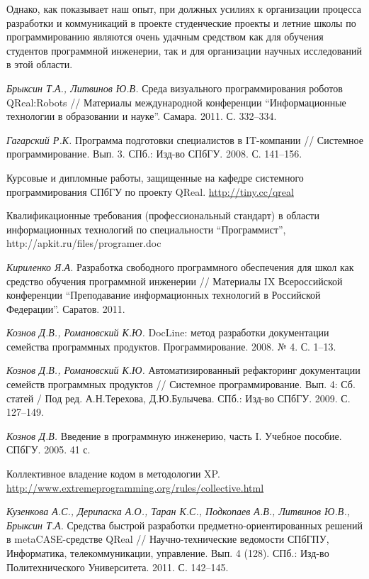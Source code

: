 \documentclass[a4paper]{article}
\begin{document}
Однако, как показывает наш опыт, при должных усилиях к организации процесса разработки и коммуникаций в проекте студенческие проекты и летние школы по программированию являются очень удачным средством как для обучения студентов программной инженерии, так и для организации научных исследований в этой области. 

\begin{thebibliography}{9001}

   \emph{Брыксин Т.А., Литвинов Ю.В.} Среда визуального программирования роботов QReal:Robots // Материалы международной конференции ``Информационные технологии в образовании и науке''. Самара. 2011. С. 332--334.
  
   \emph{Гагарский Р.К.} Программа подготовки специалистов в IT-компании // Системное программирование. Вып. 3. СПб.: Изд-во СПбГУ. 2008. С. 141--156.
  
   Курсовые и дипломные работы, защищенные на кафедре системного программирования СПбГУ по проекту QReal. \url{http://tiny.cc/qreal}

   Квалификационные требования (профессиональный стандарт) в области информационных технологий по специальности ``Программист'', http://apkit.ru/files/programer.doc
  
   \emph{Кириленко Я.А.} Разработка свободного программного обеспечения для школ как средство обучения программной инженерии // Материалы IX Всероссийской конференции ``Преподавание информационных технологий в Российской Федерации''. Саратов. 2011.
  
   \emph{Кознов Д.В., Романовский К.Ю.}  DocLine: метод разработки документации семейства программных продуктов. Программирование. 2008. № 4. С. 1--13.

   \emph{Кознов Д.В., Романовский К.Ю.} Автоматизированный рефакторинг документации семейств программных продуктов // Системное программирование. Вып. 4: Сб. статей / Под ред. А.Н.Терехова, Д.Ю.Булычева. СПб.: Изд-во СПбГУ. 2009. С. 127--149.
  
   \emph{Кознов Д.В.} Введение в программную инженерию, часть I. Учебное пособие. СПбГУ. 2005. 41 с. 

   Коллективное владение кодом в методологии XP. \url{http://www.extremeprogramming.org/rules/collective.html}
  
   \emph{Кузенкова А.С., Дерипаска А.О., Таран К.С., Подкопаев А.В., Литвинов Ю.В., Брыксин Т.А.} Средства быстрой разработки предметно-ориентированных решений в metaCASE-средстве QReal // Научно-технические ведомости СПбГПУ, Информатика, телекоммуникации, управление. Вып. 4 (128). СПб.: Изд-во Политехнического Университета. 2011. С. 142--145.


\end{thebibliography}
\end{document}
